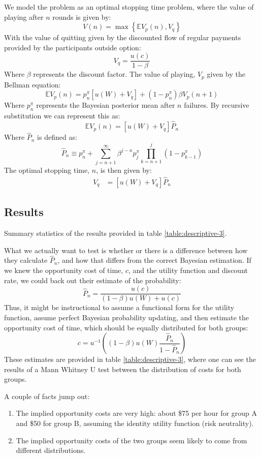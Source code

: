 \documentclass[a4paper,12pt]{article}
\begin{document}
We model the problem as an optimal stopping time problem, where the value of playing after $n$ rounds is given by:
%
$$
V(n) = \max \left\{ \mathbb{E} V_p(n), V_q \right\}
$$
%
With the value of quitting given by the discounted flow of regular payments provided by the participants outside option:
%
$$
V_q = \frac{u(c)}{1 - \beta}
$$
%
Where $\beta$ represents the discount factor. The value of playing, $V_p$ given by the Bellman equation:
%
$$
\mathbb{E}V_p(n) = p^{\pi}_n \left[ u(W) + V_q \right] +  (1 - p^{\pi}_n) \beta V_p(n+1)
$$
%
Where $p^{\pi}_n$ represents the Bayesian posterior mean after $n$ failures. By recursive substitution we can represent this as:
%
$$
\mathbb{E}V_p(n) = \left[u(W) + V_q \right] \hat{P}_n
$$
%
Where $\hat{P}_n$ is defined as:
$$
\hat{P}_n \equiv p^{\pi}_{n} + \sum_{j = n + 1}^{\infty} \beta^{j - n} p^{\pi}_{j} \prod_{k = n + 1}^{j} \left( 1 - p^{\pi}_{k - 1} \right)
$$
%
The optimal stopping time, $n$, is then given by:
%
\begin{align*}
V_q  &= \left[u(W) + V_q \right] \hat{P}_n
\end{align*}


\subsection{ Results }

Summary statistics of the results provided in table \ref{table:descriptive-3}.

What we actually want to test is whether or there is a difference between how they calculate $\hat{P}_n$, and how that differs from the correct Bayesian estimation. If we knew the opportunity cost of time, $c$, and the utility function and discount rate, we could back out their estimate of the probability:
$$
\hat{P}_n = \frac{u(c)}{(1 - \beta)u(W) + u(c)}
$$
%
Thus, it might be instructional to assume a functional form for the utility function, assume perfect Bayesian probability updating, and then estimate the opportunity cost of time, which should be equally distributed for both groups:
%
$$
c = u^{-1} \left( \left(1 - \beta \right) u(W) \frac{\hat{P}_n}{1 - \hat{P}_n} \right)
$$
%
These estimates are provided in table \ref{table:descriptive-3}, where one can see the results of a Mann Whitney U test between the distribution of costs for both groups.

A couple of facts jump out:

\begin{enumerate}
\item The implied opportunity costs are very high: about \$75 per hour for group A and \$50 for group B, assuming the identity utility function (risk neutrality).
\item The implied opportunity costs of the two groups seem likely to come from different distributions.
\end{enumerate}
\end{document}

